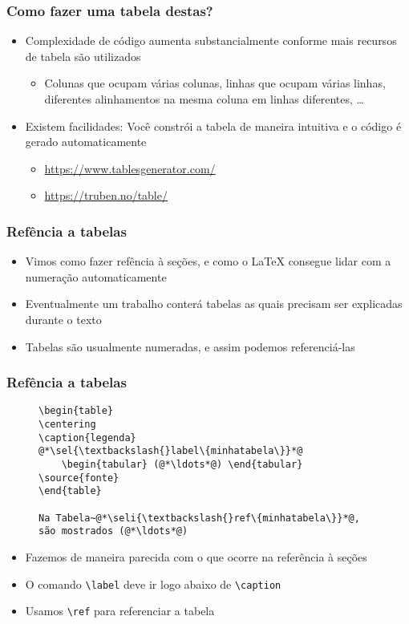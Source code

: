 \begin{frame}[fragile] \frametitle{Como fazer uma tabela destas?}
\begin{itemize}
	\item Complexidade de código aumenta substancialmente conforme mais recursos de tabela são utilizados
	\begin{itemize}
		\item Colunas que ocupam várias colunas, linhas que ocupam várias linhas, diferentes alinhamentos na mesma coluna em linhas diferentes, \ldots
	\end{itemize}
	\item Existem facilidades: Você constrói a tabela de maneira intuitiva e o código é gerado automaticamente
	\begin{itemize}
		\item \url{https://www.tablesgenerator.com/}
		\item \url{https://truben.no/table/}
	\end{itemize}
\end{itemize}
\end{frame}

\begin{frame}[fragile] \frametitle{Refência a tabelas}

\begin{itemize}
	\item Vimos como fazer refência à seções, e como o LaTeX consegue lidar com a numeração automaticamente
	\item Eventualmente um trabalho conterá tabelas as quais precisam ser explicadas durante o texto
	\item Tabelas são usualmente numeradas, e assim podemos referenciá-las
\end{itemize}

\end{frame}

\begin{frame}[fragile,label={slide:referenciatabela}] \frametitle{Refência a tabelas}
\begin{figure}[!t]
\begin{lstlisting}
\begin{table}
\centering
\caption{legenda}
@*\sel{\textbackslash{}label\{minhatabela\}}*@
	\begin{tabular} (@*\ldots*@) \end{tabular}
\source{fonte}
\end{table}

Na Tabela~@*\seli{\textbackslash{}ref\{minhatabela\}}*@, são mostrados (@*\ldots*@)
\end{lstlisting}
\end{figure}

\begin{itemize}
	\item Fazemos de maneira parecida com o que ocorre na referência à seções
	\item O comando \texttt{\textbackslash{}label} deve ir logo abaixo de \texttt{\textbackslash{}caption}
	\item Usamos \texttt{\textbackslash{}ref} para referenciar a tabela
\end{itemize}

\end{frame}
